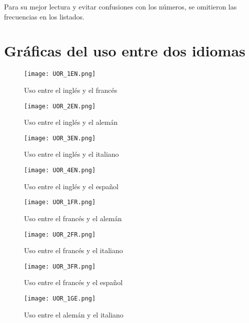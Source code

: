 Para su mejor lectura y evitar confusiones con los números,  se omitieron las frecuencias en los listados. 








\section{Gráficas del uso entre dos idiomas}
\label{palabras.acumuladas.apendice}

\begin{figure}[h!]
	\centering
	\texttt{[image: UOR\_1EN.png]}
	\label{fig.U_EF}
	\caption{Uso entre el inglés y el francés}
\end{figure}


\begin{figure}[h!]
	\centering
	\texttt{[image: UOR\_2EN.png]}
	\label{fig.U_EG}
	\caption{Uso entre el inglés y el alemán}
\end{figure}


\begin{figure}[h!]
	\centering
	\texttt{[image: UOR\_3EN.png]}
	\label{fig.U_EI}
	\caption{Uso entre el inglés y el italiano}
\end{figure}

\begin{figure}[h!]
	\centering
	\texttt{[image: UOR\_4EN.png]}
	\label{fig.U_ES}
	\caption{Uso entre el inglés y el español}
\end{figure}

\begin{figure}[h!]
	\centering
	\texttt{[image: UOR\_1FR.png]}
	\label{fig.U_FG}
	\caption{Uso entre el francés y el alemán}
\end{figure}

\begin{figure}[h!]
	\centering
	\texttt{[image: UOR\_2FR.png]}
	\label{fig.U_FI}
	\caption{Uso entre el francés y el italiano}
\end{figure}

\begin{figure}[h!]
	\centering
	\texttt{[image: UOR\_3FR.png]}
	\label{fig.U_FS}
	\caption{Uso entre el francés y el español}
\end{figure}



\begin{figure}[h!]
	\centering
	\texttt{[image: UOR\_1GE.png]}
	\label{fig.U_GI}
	\caption{Uso entre el alemán y el italiano}
\end{figure}


